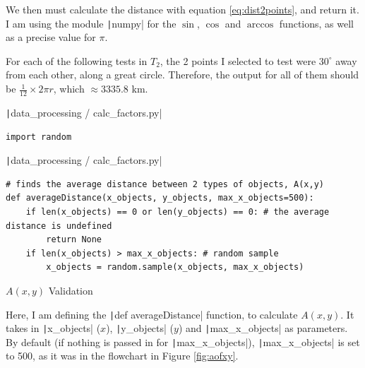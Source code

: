\documentclass[12pt]{report}
\newcommand{\pil}[1]{\protect\texttt|#1|}
\begin{document}
We then must calculate the distance with equation \ref{eq:dist2points}, and return it. I am using the module \pil{numpy} for the $\sin$, $\cos$ and $\arccos$ functions, as well as a precise value for $\pi$.

For each of the following tests in $T_{2}$, the 2 points I selected to test were $30^{\circ}$ away from each other, along a great circle. Therefore, the output for all of them should be $\frac{1}{12}\times 2\pi r$, which $\approx 3335.8$ \unit{km}.

\begin{center}
\end{center}

\begin{listing}[H]
\pil{data_processing / calc_factors.py}
\begin{verbatim}
import random
\end{verbatim}
\pil{data_processing / calc_factors.py}
\begin{verbatim}
# finds the average distance between 2 types of objects, A(x,y)
def averageDistance(x_objects, y_objects, max_x_objects=500):
    if len(x_objects) == 0 or len(y_objects) == 0: # the average distance is undefined
        return None
    if len(x_objects) > max_x_objects: # random sample
        x_objects = random.sample(x_objects, max_x_objects)
\end{verbatim}
\caption{$A\left(x,y\right)$ Validation}\label{cs:aofxyValidation}
\end{listing}

Here, I am defining the \pil{def averageDistance} function, to calculate $A\left(x,y\right)$. It takes in \pil{x_objects} ($x$), \pil{y_objects} ($y$) and \pil{max_x_objects} as parameters. By default (if nothing is passed in for \pil{max_x_objects}), \pil{max_x_objects} is set to 500, as it was in the flowchart in Figure \ref{fig:aofxy}.
\end{document}
